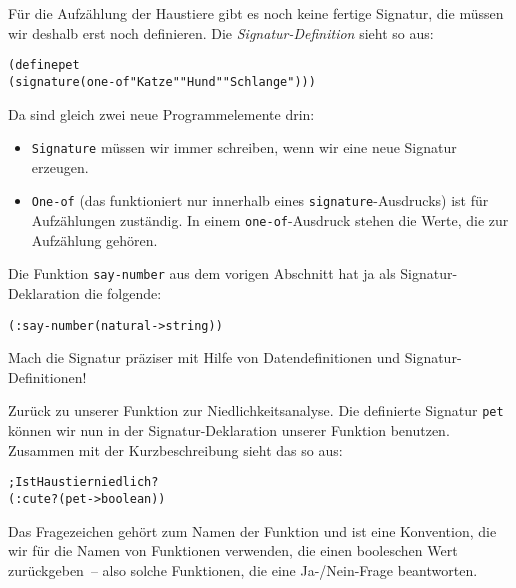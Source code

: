 Für die Aufzählung der Haustiere gibt es noch keine fertige Signatur,
die müssen wir deshalb erst noch definieren.  Die
\textit{Signatur-Definition} sieht so
aus:
\label{sec:pet}
%
\begin{alltt}
(define pet
  (signature (one-of "Katze" "Hund" "Schlange")))
\end{alltt}
%
Da sind gleich zwei neue Programmelemente drin:
%
\begin{itemize}
\item \texttt{Signature} müssen wir immer schreiben, wenn wir eine
  neue Signatur erzeugen.
\item \texttt{One-of} (das funktioniert
  nur innerhalb eines \texttt{signature}-Ausdrucks) ist für
  Aufzählungen zuständig.  In einem \texttt{one-of}-Ausdruck stehen
  die Werte, die zur Aufzählung gehören.
\end{itemize}
%
\begin{aufgabe}
  Die Funktion \texttt{say-number} aus dem vorigen Abschnitt hat ja als
  Signatur-Deklaration die folgende:
\begin{alltt}
(: say-number (natural -> string))
\end{alltt}
  Mach die Signatur präziser mit Hilfe von Datendefinitionen und
  Signatur-Definitionen!
\end{aufgabe}
%
Zurück zu unserer Funktion zur Niedlichkeitsanalyse.  Die definierte
Signatur \texttt{pet} können wir nun in der Signatur-Deklaration
unserer Funktion benutzen.  Zusammen mit der Kurzbeschreibung sieht
das so aus:
%
\begin{alltt}
; Ist Haustier niedlich?
(: cute? (pet -> boolean))
\end{alltt}
%
Das Fragezeichen gehört zum Namen der Funktion und ist eine
Konvention, die wir für die Namen von Funktionen verwenden, die einen
booleschen Wert zurückgeben~-- also solche Funktionen, die eine
Ja-/Nein-Frage beantworten.

